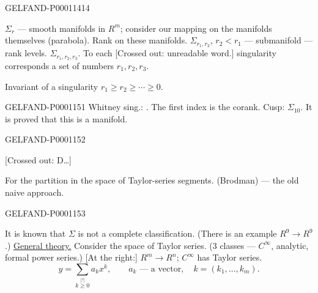 \begin{GelfandAdjacentEvidence}{GELFAND-P000114}{14}


$\Sigma_r$ — smooth manifolds in $R^m$; consider our mapping on the manifolds
themselves (parabola). Rank on these manifolds.
$\Sigma_{r_1,r_2}$, $r_2<r_1$ — submanifold — rank levels.
$\Sigma_{r_1,r_2,r_3}$.
To each [Crossed out: unreadable word.] singularity corresponds a set of numbers $r_1,r_2,r_3$.
\end{GelfandAdjacentEvidence}

Invariant of a singularity $r_1\ge r_2\ge\cdots\ge0$.


\begin{GelfandAdjacentEvidence}{GELFAND-P000115}{1}
Whitney sing.: .
The first index is the corank.
Cusp: $\Sigma_{10}$. It is proved that this is a manifold.
\end{GelfandAdjacentEvidence}
\begin{GelfandAdjacentEvidence}{GELFAND-P000115}{2}

[Crossed out: D…]

For the partition in the space of Taylor-series segments. (Brodman) —
the old naive approach.
\end{GelfandAdjacentEvidence}
\begin{GelfandAdjacentEvidence}{GELFAND-P000115}{3}


It is known that $\Sigma$ is not a complete classification.
(There is an example $R^9\longrightarrow R^9$.)
\underline{General theory.} Consider the space of Taylor series.
($3$ classes — $C^\infty$, analytic, formal power series.)
[At the right:] $R^m\longrightarrow R^n$; $C^\infty$ has Taylor series.
\begin{equation*}y=\sum_{k\mathrel{\overset{\text{[?]}}{\ge}}0}a_kx^k,\qquad a_k\text{ — a vector},\quad k=(k_1,\ldots,k_m).\end{equation*}
\end{GelfandAdjacentEvidence}
